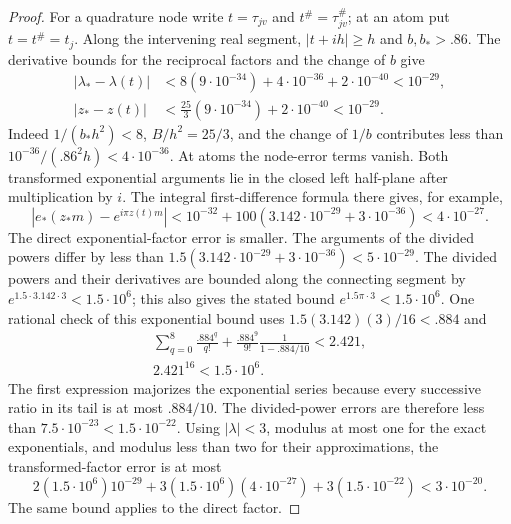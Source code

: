 \begin{proof}
For a quadrature node write $t=\tau_{jv}$ and $t^{\#}=\tau_{jv}^{\#}$;
at an atom put $t=t^{\#}=t_j$.  Along the intervening real segment,
$|t+ih|\ge h$ and $b,b_*>.86$.  The derivative bounds for the reciprocal
factors and the change of $b$ give
\[
\begin{aligned}
 |\lambda_* -\lambda(t)|
  &<8(9\cdot10^{-34})+4\cdot10^{-36}+2\cdot10^{-40}<10^{-29},\\
 |z_*-z(t)|
  &<\frac{25}{3}(9\cdot10^{-34})+2\cdot10^{-40}<10^{-29}.
\end{aligned}
\]
Indeed $1/(b_*h^2)<8$, $B/h^2=25/3$, and the change of $1/b$ contributes
less than $10^{-36}/(.86^2h)<4\cdot10^{-36}$.  At atoms the node-error
terms vanish.  Both transformed exponential arguments lie in the closed
left half-plane after multiplication by $i$.  The integral first-difference
formula there gives, for example,
\[
 |e_*(z_*m)-e^{i\pi z(t)m}|
 <10^{-32}+100(3.142\cdot10^{-29}+3\cdot10^{-36})<4\cdot10^{-27}.
\]
The direct exponential-factor error is smaller.  The arguments of the
divided powers differ by less than
$1.5(3.142\cdot10^{-29}+3\cdot10^{-36})<5\cdot10^{-29}$.
The divided powers and their derivatives are bounded along the connecting
segment by $e^{1.5\cdot3.142\cdot3}<1.5\cdot10^6$; this also gives the
stated bound $e^{1.5\pi\cdot3}<1.5\cdot10^6$.  One rational check of this
exponential bound uses $1.5(3.142)(3)/16<.884$ and
\[
\begin{gathered}
 \sum_{q=0}^{8}\frac{.884^q}{q!}
 +\frac{.884^9}{9!}\frac1{1-.884/10}<2.421,\\
 2.421^{16}<1.5\cdot10^6.
\end{gathered}
\]
The first expression majorizes the exponential series because every
successive ratio in its tail is at most $.884/10$.
The divided-power errors are therefore less than
$7.5\cdot10^{-23}<1.5\cdot10^{-22}$.
Using $|\lambda|<3$, modulus at most one for the exact exponentials, and
modulus less than two for their approximations, the transformed-factor
error is at most
\[
 2(1.5\cdot10^6)10^{-29}
 +3(1.5\cdot10^6)(4\cdot10^{-27})
 +3(1.5\cdot10^{-22})<3\cdot10^{-20}.
\]
The same bound applies to the direct factor.


\end{proof}
